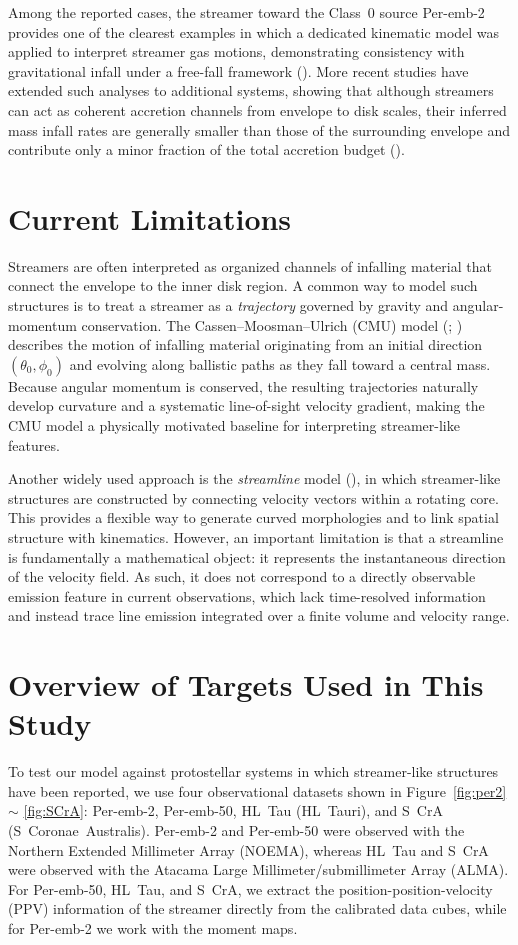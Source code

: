 Among the reported cases, the streamer toward the Class~0 source Per-emb-2 provides one of the clearest examples in which a dedicated kinematic model was applied to interpret streamer gas motions, demonstrating consistency with gravitational infall under a free-fall framework (\citealt{Pineda_2020}). More recent studies have extended such analyses to additional systems, showing that although streamers can act as coherent accretion channels from envelope to disk scales, their inferred mass infall rates are generally smaller than those of the surrounding envelope and contribute only a minor fraction of the total accretion budget (\citealt{Gahm_2018, Yen_2019, Pineda_2020, Valdivia-Mena_2022, Hsieh_2023, Kido_2025}).

\section{Current Limitations}
Streamers are often interpreted as organized channels of infalling material that connect the envelope to the inner disk region. A common way to model such structures is to treat a streamer as a \emph{trajectory} governed by gravity and angular-momentum conservation. The Cassen--Moosman--Ulrich (CMU) model (\citealt{Ulrich_1976}; \citealt{Cassen_1981}) describes the motion of infalling material originating from an initial direction $(\theta_0,\phi_0)$ and evolving along ballistic paths as they fall toward a central mass. Because angular momentum is conserved, the resulting trajectories naturally develop curvature and a systematic line-of-sight velocity gradient, making the CMU model a physically motivated baseline for interpreting streamer-like features.

Another widely used approach is the \emph{streamline} model (\citealt{Mendoza_2009}), in which streamer-like structures are constructed by connecting velocity vectors within a rotating core. This provides a flexible way to generate curved morphologies and to link spatial structure with kinematics. However, an important limitation is that a streamline is fundamentally a mathematical object: it represents the instantaneous direction of the velocity field. As such, it does not correspond to a directly observable emission feature in current observations, which lack time-resolved information and instead trace line emission integrated over a finite volume and velocity range.

\section{Overview of Targets Used in This Study}
To test our model against protostellar systems in which streamer-like structures have been reported, we use four observational datasets shown in Figure~\ref{fig:per2} $\sim$ \ref{fig:SCrA}: Per-emb-2, Per-emb-50, HL~Tau (HL~Tauri), and S~CrA (S~Coronae~Australis). Per-emb-2 and Per-emb-50 were observed with the Northern Extended Millimeter Array (NOEMA), whereas HL~Tau and S~CrA were observed with the Atacama Large Millimeter/submillimeter Array (ALMA). For Per-emb-50, HL~Tau, and S~CrA, we extract the position-position-velocity (PPV) information of the streamer directly from the calibrated data cubes, while for Per-emb-2 we work with the moment maps. 


